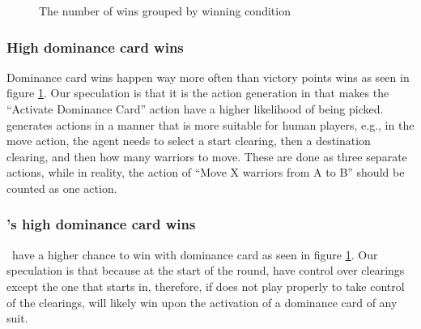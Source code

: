 \begin{figure}
    \centering
    \caption{The number of wins grouped by winning condition}
    \label{fig:wins-by-winner-condition}
\end{figure}

\subsubsection{High dominance card wins} \label{high-dominance-card-wins}
Dominance card wins happen way more often than victory points wins as seen in figure \ref{fig:wins-by-winner-condition}. Our speculation is that it is the action generation in \RootOurs{} that makes the ``Activate Dominance Card'' action have a higher likelihood of being picked. \RootOurs{} generates actions in a manner that is more suitable for human players, e.g., in the move action, the agent needs to select a start clearing, then a destination clearing, and then how many warriors to move. These are done as three separate actions, while in reality, the action of ``Move X warriors from A to B'' should be counted as one action.

\subsubsection{\Marquise's high dominance card wins}
\Marquise \ have a higher chance to win with dominance card as seen in figure \ref{fig:wins-by-winner-condition}. Our speculation is that because at the start of the round, \Marquise{} have control over clearings except the one that \Eyrie{} starts in, therefore, if \Eyrie{} does not play properly to take control of the clearings, \Marquise{} will likely win upon the activation of a dominance card of any suit.


